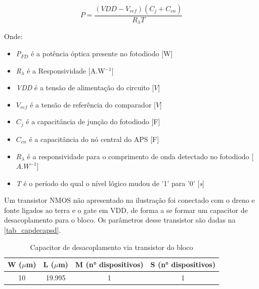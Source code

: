 \begin{equation}
    \label{eq_apsd}
    P = \frac{(VDD-V_{ref})(C_{j}+C_{cn})}{R_{\lambda}T}
\end{equation}

Onde:

\begin{itemize}

    \item \emph{P$_{FD}$} \'e a pot\^encia \'optica presente no fotodiodo [W]
    \item \emph{R$_\lambda$} \'e a Responsividade [A.W$^{-1}$]
    \item \emph{VDD} \'e a tens\~ao de alimenta{\c c}\~ao do circuito [$V$]
    \item \emph{$V_{ref}$} \'e a tens\~ao de refer\^encia do comparador [$V$]
    \item \emph{$C_j$} \'e a capacit\^ancia de jun{\c c}\~ao do fotodiodo [F]
    \item \emph{$C_{cn}$} \'e a capacit\^ancia do n\'o central do APS [F]
    \item $R_{\lambda}$ \'e a responsividade para o comprimento de onda detectado no fotodiodo [$A.W^{-1}$]
    \item \emph{T} \'e o per\'iodo do qual o n\'ivel l\'ogico mudou de '1' para '0' [\emph{s}]
    
\end{itemize}

Um transistor NMOS n\~ao apresentado na ilustra{\c c}\~ao foi conectado com o dreno e fonte ligados ao terra e o gate em VDD, de forma a se formar um capacitor de desacoplamento para o bloco. Os par\^ametros desse transistor s\~ao dadas na \autoref{tab_capdecapsd}.

\begin{table}[htbp]
\caption{Capacitor de desacoplamento via transistor do bloco \NomeBloco}
\label{tab_capdecapsd}
\centering
\begin{tabular}{cccc}
\toprule
W ($\mu$m)  & L ($\mu$m) & M (n° dispositivos) & S (n° dispositivos)\\
\midrule \midrule
10 & 19.995 & 1 & 1\\
\bottomrule
\end{tabular}
\end{table}
\clearpage


